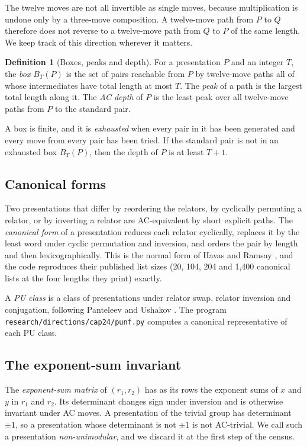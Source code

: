 \documentclass[11pt,a4paper]{article}
\theoremstyle{definition}
\newtheorem{definition}[theorem]{Definition}
\begin{document}
The twelve moves are not all invertible as single moves, because multiplication is undone only by a three-move composition. A twelve-move path from $P$ to $Q$ therefore does not reverse to a twelve-move path from $Q$ to $P$ of the same length. We keep track of this direction wherever it matters.

\begin{definition}[Boxes, peaks and depth]
For a presentation $P$ and an integer $T$, the \emph{box} $B_T(P)$ is the set of pairs reachable from $P$ by twelve-move paths all of whose intermediates have total length at most $T$. The \emph{peak} of a path is the largest total length along it. The \emph{AC depth} of $P$ is the least peak over all twelve-move paths from $P$ to the standard pair.
\end{definition}

A box is finite, and it is \emph{exhausted} when every pair in it has been generated and every move from every pair has been tried. If the standard pair is not in an exhausted box $B_T(P)$, then the depth of $P$ is at least $T+1$.

\subsection{Canonical forms}

Two presentations that differ by reordering the relators, by cyclically permuting a relator, or by inverting a relator are AC-equivalent by short explicit paths. The \emph{canonical form} of a presentation reduces each relator cyclically, replaces it by the least word under cyclic permutation and inversion, and orders the pair by length and then lexicographically. This is the normal form of Havas and Ramsay \cite{HR03}, and the code reproduces their published list sizes (20, 104, 204 and 1,400 canonical lists at the four lengths they print) exactly.

A \emph{PU class} is a class of presentations under relator swap, relator inversion and conjugation, following Panteleev and Ushakov \cite{PU19}. The program \texttt{research/directions/cap24/punf.py} computes a canonical representative of each PU class.

\subsection{The exponent-sum invariant}

The \emph{exponent-sum matrix} of $(r_1,r_2)$ has as its rows the exponent sums of $x$ and $y$ in $r_1$ and $r_2$. Its determinant changes sign under inversion and is otherwise invariant under AC moves. A presentation of the trivial group has determinant $\pm1$, so a presentation whose determinant is not $\pm1$ is not AC-trivial. We call such a presentation \emph{non-unimodular}, and we discard it at the first step of the census.
\end{document}
